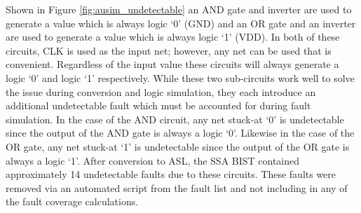 \documentclass[12pt]{report}
\begin{document}
Shown in Figure \ref{fig:ausim_undetectable} an AND gate and inverter are used to generate a value which is always logic `0' (GND) and an OR gate and an inverter are used to generate a value which is always logic `1' (VDD).  In both of these circuits, CLK is used as the input net; however, any net can be used that is convenient.  Regardless of the input value these circuits will always generate a logic `0' and logic `1' respectively.  While these two sub-circuits work well to solve the issue during conversion and logic simulation, they each introduce an additional undetectable fault which must be accounted for during fault simulation.  In the case of the AND circuit, any net stuck-at `0' is undetectable since the output of the AND gate is always a logic `0'.  Likewise in the case of the OR gate, any net stuck-at `1' is undetectable since the output of the OR gate is always a logic `1'.  After conversion to ASL, the SSA BIST contained approximately 14 undetectable faults due to these circuits.  These faults were removed via an automated script from the fault list and not including in any of the fault coverage calculations.
\end{document}
